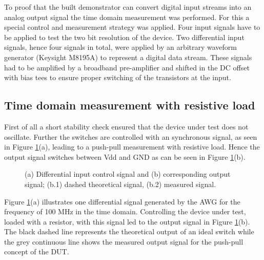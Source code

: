 \documentclass[journal]{IEEEtran}
\begin{document}
To proof that the built demonstrator can convert digital input streams into an analog output signal the time domain measurement was performed.
For this a special control and measurement strategy was applied.
Four input signals have to be applied to test the two bit resolution of the device. Two differential input signals, hence four signals in total, were applied by an arbitrary waveform generator (Keysight M8195A) to represent a digital data stream. 
These signals had to be amplified by a broadband pre-amplifier and shifted in the DC offset with bias tees to ensure proper switching of the transistors at the input.
%
\subsection{Time domain measurement with resistive load}
First of all a short stability check ensured that the device under test does not oscillate.
Further the switches are controlled with an synchronous signal, as seen in Figure \ref{fig:meas_Input_Output_RLoad_100M_SmallSize_Paper}(a), leading to a push-pull measurement with resistive load.
Hence the output signal switches between Vdd and GND as can be seen in Figure \ref{fig:meas_Input_Output_RLoad_100M_SmallSize_Paper}(b).
%
\begin{figure}[htb]
  \centering
	\begin{scriptsize}
  	\def\svgwidth{\columnwidth}
 	 
  	\caption{(a) Differential input control signal and (b) corresponding output signal; (b.1) dashed theoretical signal, (b.2) measured signal.}
  	\label{fig:meas_Input_Output_RLoad_100M_SmallSize_Paper}
	\end{scriptsize}
\end{figure}
Figure \ref{fig:meas_Input_Output_RLoad_100M_SmallSize_Paper}(a) illustrates one differential signal generated by the AWG for the frequency of 100 MHz in the time domain.
Controlling the device under test, loaded with a resistor, with this signal led to the output signal in Figure \ref{fig:meas_Input_Output_RLoad_100M_SmallSize_Paper}(b).
The black dashed line represents the theoretical output of an ideal switch while the grey continuous line shows the measured output signal for the push-pull concept of the DUT.
\end{document}

